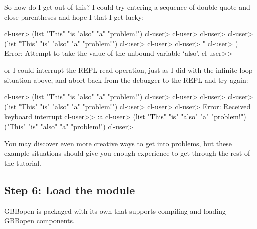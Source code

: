 \documentclass[10pt,twoside,english,pdftex]{article}
\begin{document}
So how do I get out of this?  I could try entering a sequence of double-quote
and close parentheses and hope I that I get lucky:
%
\W\supp
\begin{example}
\textcolor{darkergray}{%
  cl-user> (list "This" "is "also" "a" "problem!")
  cl-user>
  cl-user>
  cl-user>
  cl-user> (list "This" "is" "also" "a" "problem!")
  cl-user>
  cl-user>
  cl-user> \textcolor{black}{"}
  cl-user> \textcolor{black}{)}
  Error: Attempt to take the value of the unbound variable `also'.
  cl-user>>}
\end{example}
%
or I could interrupt the REPL read operation, just as I did with the infinite
loop situation above, and abort back from the debugger to the REPL and try
again:
%
\W\supp\notpretop
\begin{example}
\textcolor{darkergray}{%
  cl-user> (list "This" "is "also" "a" "problem!")
  cl-user>
  cl-user>
  cl-user>
  cl-user> (list "This" "is" "also" "a" "problem!")
  cl-user>
  cl-user>
  cl-user> \textcolor{black}{}
  Error: Received keyboard interrupt 
  cl-user>> \textcolor{black}{:a}
  cl-user> \textcolor{black}{(list "This" "is" "also" "a" "problem!")}
  ("This" "is" "also" "a" "problem!")
  cl-user>}
\end{example}

You may discover even more creative ways to get into problems, but these
example situations should give you enough experience to get through the rest
of the tutorial.

\subsection*{Step 6: Load the  module}

%
GBBopen is packaged with its own 
that supports compiling and loading GBBopen components.
\end{document}
